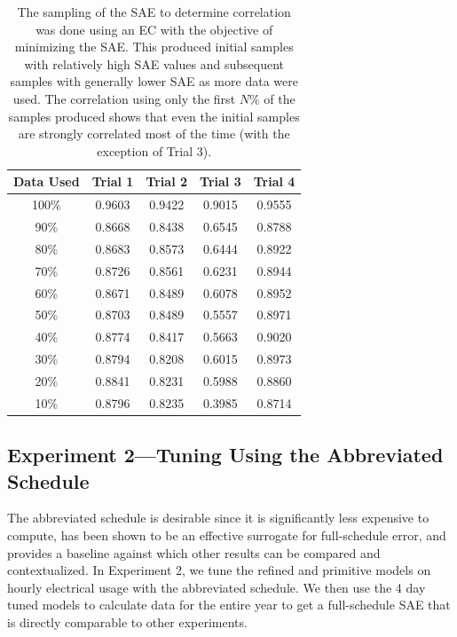 \documentclass[preprint, review, 12pt]{elsarticle}
\begin{document}
\begin{table}[htbp]
\centering
\caption{The sampling of the SAE to determine correlation was done using an EC with the objective of minimizing the SAE. This produced initial samples with relatively high SAE values and subsequent samples with generally lower SAE as more data were used. The correlation using only the first $N$\% of the samples produced shows that even the initial samples are strongly correlated most of the time (with the exception of Trial 3).}
\label{tab:hour-corr}
\begin{tabular}{ccccc}
\toprule
Data Used & Trial 1 & Trial 2 & Trial 3 & Trial 4\\
\midrule
100\% & 0.9603 & 0.9422 & 0.9015 & 0.9555\\\rowcolor{DarkRow}
90\%  & 0.8668 & 0.8438 & 0.6545 & 0.8788\\
80\%  & 0.8683 & 0.8573 & 0.6444 & 0.8922\\\rowcolor{DarkRow}
70\%  & 0.8726 & 0.8561 & 0.6231 & 0.8944\\
60\%  & 0.8671 & 0.8489 & 0.6078 & 0.8952\\\rowcolor{DarkRow}
50\%  & 0.8703 & 0.8489 & 0.5557 & 0.8971\\
40\%  & 0.8774 & 0.8417 & 0.5663 & 0.9020\\\rowcolor{DarkRow}
30\%  & 0.8794 & 0.8208 & 0.6015 & 0.8973\\
20\%  & 0.8841 & 0.8231 & 0.5988 & 0.8860\\\rowcolor{DarkRow}
10\%  & 0.8796 & 0.8235 & 0.3985 & 0.8714\\
\bottomrule
\end{tabular}
\end{table}


\subsection{Experiment 2---Tuning Using the Abbreviated Schedule}
\label{sub:experiment2}
The abbreviated schedule is desirable since it is significantly less expensive to compute, has been shown to be an effective surrogate for full-schedule error, and provides a baseline against which other results can be compared and contextualized. In Experiment 2, we tune the refined and primitive models on hourly electrical usage with the abbreviated schedule. We then use the 4 day tuned models to calculate data for the entire year to get a full-schedule SAE that is directly comparable to other experiments. %
\end{document}
